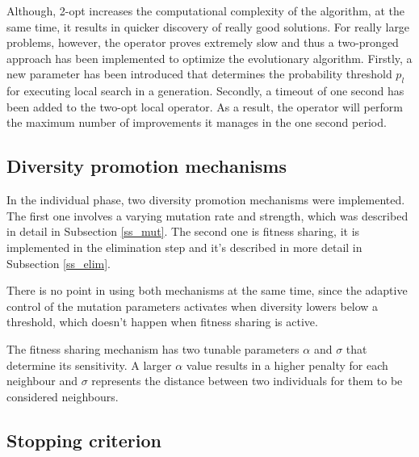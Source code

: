 \documentclass[a4paper,10pt]{article}
\newcommand{\ReplaceMe}[1]{{\color{blue}#1}}
\begin{document}
Although, 2-opt increases the computational complexity of the algorithm, at the same time, it results in quicker discovery of really good solutions. For really large problems, however, the operator proves extremely slow and thus a two-pronged approach has been implemented to optimize the evolutionary algorithm. Firstly, a new parameter has been introduced that determines the probability threshold $p_l$ for executing local search in a generation. Secondly, a timeout of one second has been added to the two-opt local operator. As a result, the operator will perform the maximum number of improvements it manages in the one second period.


\subsection{Diversity promotion mechanisms}


In the individual phase, two diversity promotion mechanisms were implemented. The first one involves a varying mutation rate and strength, which was described in detail in Subsection \ref{ss_mut}. The second one is fitness sharing, it is implemented in the elimination step and it's described in more detail in Subsection \ref{ss_elim}.

There is no point in using both mechanisms at the same time, since the adaptive control of the mutation parameters activates when diversity lowers below a threshold, which doesn't happen when fitness sharing is active.

The fitness sharing mechanism has two tunable parameters $\alpha$ and $\sigma$ that determine its sensitivity. A larger $\alpha$ value results in a higher penalty for each neighbour and $\sigma$ represents the distance between two individuals for them to be considered neighbours. 

\subsection{Stopping criterion}

\end{document}
